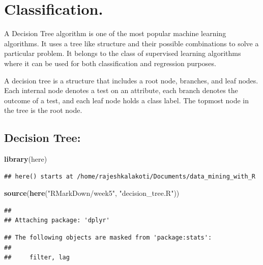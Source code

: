 \documentclass[a4paper,conference]{IEEEtran}
\newenvironment{Shaded}{\begin{snugshade}}{\end{snugshade}}
\newcommand{\FunctionTok}[1]{\textcolor[rgb]{0.13,0.29,0.53}{\textbf{#1}}}
\newcommand{\NormalTok}[1]{#1}
\newcommand{\StringTok}[1]{\textcolor[rgb]{0.31,0.60,0.02}{#1}}
\begin{document}
\hypertarget{sec:classification.}{%
\section{Classification.}\label{sec:classification.}}

A Decision Tree algorithm is one of the most popular machine learning
algorithms. It uses a tree like structure and their possible
combinations to solve a particular problem. It belongs to the class of
supervised learning algorithms where it can be used for both
classification and regression purposes.

A decision tree is a structure that includes a root node, branches, and
leaf nodes. Each internal node denotes a test on an attribute, each
branch denotes the outcome of a test, and each leaf node holds a class
label. The topmost node in the tree is the root node.

\hypertarget{sec:decision-tree}{%
\subsection{Decision Tree:}\label{sec:decision-tree}}

\begin{Shaded}
\begin{Highlighting}[]
\FunctionTok{library}\NormalTok{(here)}
\end{Highlighting}
\end{Shaded}

\begin{verbatim}
## here() starts at /home/rajeshkalakoti/Documents/data_mining_with_R
\end{verbatim}

\begin{Shaded}
\begin{Highlighting}[]
\FunctionTok{source}\NormalTok{(}\FunctionTok{here}\NormalTok{(}\StringTok{"RMarkDown/week5"}\NormalTok{,}
            \StringTok{"decision\_tree.R"}\NormalTok{))}
\end{Highlighting}
\end{Shaded}

\begin{verbatim}
## 
## Attaching package: 'dplyr'
\end{verbatim}

\begin{verbatim}
## The following objects are masked from 'package:stats':
## 
##     filter, lag
\end{verbatim}
\end{document}
